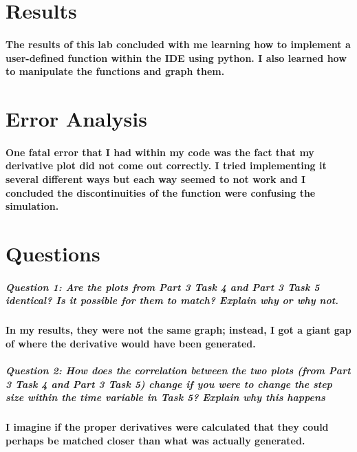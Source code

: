 \documentclass[12pt,a4paper]{article}
\begin{document}
\section{Results}\label{sec:res}

\paragraph{The results of this lab concluded with me learning how to implement a user-defined function within the IDE using python. I also learned how to manipulate the functions and graph them.}



\section{Error Analysis}\label{sec:res}

\paragraph{One fatal error that I had within my code was the fact that my derivative plot did not come out correctly. I tried implementing it several different ways but each way seemed to not work and I concluded the discontinuities of the function were confusing the simulation.}


\section{Questions}\label{sec:res}


\subparagraph{\large Question 1: Are the plots from Part 3 Task 4 and Part 3 Task 5 identical? 
Is it possible for them to match? 
Explain why or why not.}


\paragraph{In my results, they were not the same graph; instead, I got a giant gap of where the derivative would have been generated.} 

\subparagraph{\large Question 2: How does the correlation between the two plots (from Part 3 Task 4 and Part 3 Task 5)
change if you were to change the step size within the time variable in Task 5? Explain why
this happens}

\paragraph{I imagine if the proper derivatives were calculated that they could perhaps be matched closer than what was actually generated.}
\end{document}
